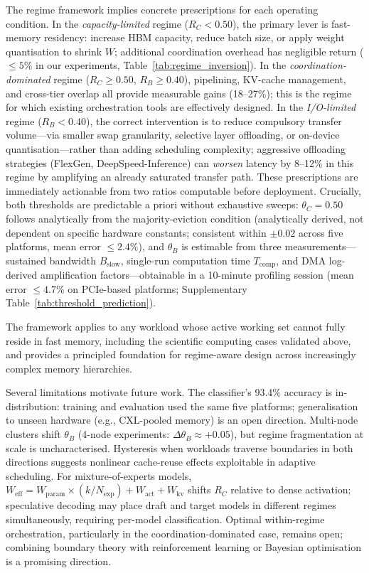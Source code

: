The regime framework implies concrete prescriptions for each operating
condition.
In the \emph{capacity-limited} regime ($R_C < 0.50$), the primary lever is
fast-memory residency: increase HBM capacity, reduce batch size, or apply
weight quantisation to shrink $W$; additional coordination overhead has
negligible return ($\leq 5\%$ in our experiments, Table~\ref{tab:regime_inversion}).
In the \emph{coordination-dominated} regime ($R_C \geq 0.50$, $R_B \geq 0.40$),
pipelining, KV-cache management, and cross-tier overlap all provide measurable
gains (18--27\%); this is the regime for which existing orchestration tools
are effectively designed.
In the \emph{I/O-limited} regime ($R_B < 0.40$), the correct intervention is
to reduce compulsory transfer volume---via smaller swap granularity, selective
layer offloading, or on-device quantisation---rather than adding scheduling
complexity; aggressive offloading strategies (FlexGen, DeepSpeed-Inference)
can \emph{worsen} latency by 8--12\% in this regime by amplifying an already
saturated transfer path.
These prescriptions are immediately actionable from two ratios computable
before deployment.
Crucially, both thresholds are predictable a priori without exhaustive
sweeps: $\theta_C = 0.50$ follows analytically from the majority-eviction
condition (analytically derived, not dependent on specific hardware constants;
consistent within $\pm 0.02$ across five platforms, mean error $\leq 2.4\%$), and $\theta_B$ is estimable from three measurements---sustained
bandwidth $B_{\mathrm{slow}}$, single-run computation time $T_{\mathrm{comp}}$,
and DMA log-derived amplification factors---obtainable in a 10-minute
profiling session (mean error $\leq 4.7\%$ on PCIe-based platforms;
Supplementary Table~\ref{tab:threshold_prediction}).

The framework applies to any workload whose active working set cannot fully
reside in fast memory, including the scientific computing cases validated above,
and provides a principled foundation for regime-aware design across increasingly
complex memory hierarchies.

Several limitations motivate future work.
The classifier's 93.4\% accuracy is in-distribution: training and evaluation
used the same five platforms; generalisation to unseen hardware
(e.g., CXL-pooled memory) is an open direction.
Multi-node clusters shift $\theta_B$ (4-node experiments: $\Delta\theta_B \approx +0.05$),
but regime fragmentation at scale is uncharacterised.
Hysteresis when workloads traverse boundaries in both directions suggests
nonlinear cache-reuse effects exploitable in adaptive scheduling.
For mixture-of-experts models, $W_{\mathrm{eff}} = W_{\mathrm{param}} \times (k/N_{\mathrm{exp}}) + W_{\mathrm{act}} + W_{\mathrm{kv}}$ shifts $R_C$ relative to
dense activation; speculative decoding may place draft and target models in
different regimes simultaneously, requiring per-model classification.
Optimal within-regime orchestration, particularly in the coordination-dominated
case, remains open; combining boundary theory with reinforcement learning or
Bayesian optimisation is a promising direction.
